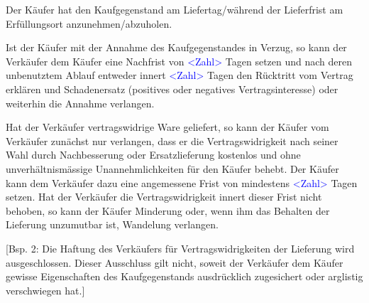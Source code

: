 \documentclass[parskip=half]{scrreprt}
\begin{document}
\begin{contract}
Der Käufer hat den Kaufgegenstand am Liefertag/während der Lieferfrist am Erfüllungsort anzunehmen/abzuholen.

Ist der Käufer mit der Annahme des Kaufgegenstandes in Verzug, so kann der Verkäufer dem Käufer eine Nachfrist von \textcolor{blue}{<Zahl>} Tagen setzen und nach deren unbenutztem Ablauf entweder innert \textcolor{blue}{<Zahl>} Tagen den Rücktritt vom Vertrag erklären und Schadenersatz (positives oder negatives Vertragsinteresse) oder weiterhin die Annahme verlangen.

\parnumbertrue





Hat der Verkäufer vertragswidrige Ware geliefert, so kann der Käufer vom Verkäufer zunächst nur verlangen, dass er die Vertragswidrigkeit nach seiner Wahl durch Nachbesserung oder Ersatzlieferung kostenlos und ohne unverhältnismässige Unannehmlichkeiten für den Käufer behebt. Der Käufer kann dem Verkäufer dazu eine angemessene Frist von mindestens \textcolor{blue}{<Zahl>} Tagen setzen. Hat der Verkäufer die Vertragswidrigkeit innert dieser Frist nicht behoben, so kann der Käufer Minderung oder, wenn ihm das Behalten der Lieferung unzumutbar ist, Wandelung verlangen.


[Bsp. 2: Die Haftung des Verkäufers für Vertragswidrigkeiten der Lieferung wird ausgeschlossen. Dieser Ausschluss gilt nicht, soweit der Verkäufer dem Käufer gewisse Eigenschaften des Kaufgegenstands ausdrücklich zugesichert oder arglistig verschwiegen hat.]
\parnumbertrue


\end{contract}
\end{document}
